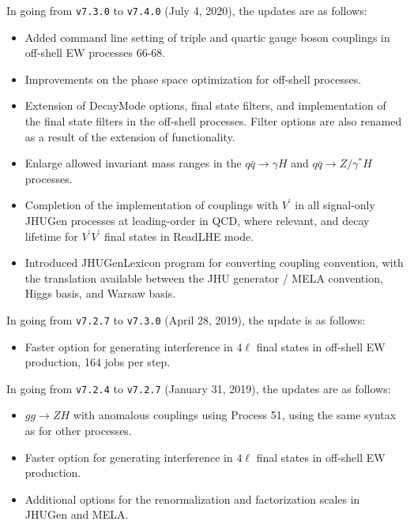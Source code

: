 \documentclass[aps,superscriptaddress,nofootinbib]{revtex4}
\begin{document}
\noindent
In going from \verb|v7.3.0| to \verb|v7.4.0| (July 4, 2020), the updates are as follows:
\begin{itemize}
\item Added command line setting of triple and quartic gauge boson couplings in off-shell EW processes 66-68.
\item Improvements on the phase space optimization for off-shell processes.
\item Extension of DecayMode options, final state filters, and implementation of the final state filters in the off-shell processes. Filter options are also renamed as a result of the extension of functionality.
\item Enlarge allowed invariant mass ranges in the $q\bar{q} \to \gamma H$ and $q\bar{q} \to Z/\gamma^* H$ processes.
\item Completion of the implementation of couplings with $V^\prime$ in all signal-only JHUGen processes at leading-order in QCD, where relevant, and decay lifetime for $V^\prime V^\prime$ final states in ReadLHE mode.
\item Introduced JHUGenLexicon program for converting coupling convention, 
with the translation available between the JHU generator / MELA convention, Higgs basis, and Warsaw basis. 
\end{itemize}
\noindent
%
In going from \verb|v7.2.7| to \verb|v7.3.0| (April 28, 2019), the update is as follows:
\begin{itemize}
\item Faster option for generating interference in \(4\ell\) final states in off-shell EW production, 164 jobs per step.
\end{itemize}
\noindent
%
In going from \verb|v7.2.4| to \verb|v7.2.7| (January 31, 2019), the updates are as follows:
\begin{itemize}
\item $gg\to ZH$ with anomalous couplings using Process 51, using the same syntax as for other processes.
\item Faster option for generating interference in \(4\ell\) final states in off-shell EW production.
\item Additional options for the renormalization and factorization scales in JHUGen and MELA.
\end{itemize}
\noindent
\end{document}

